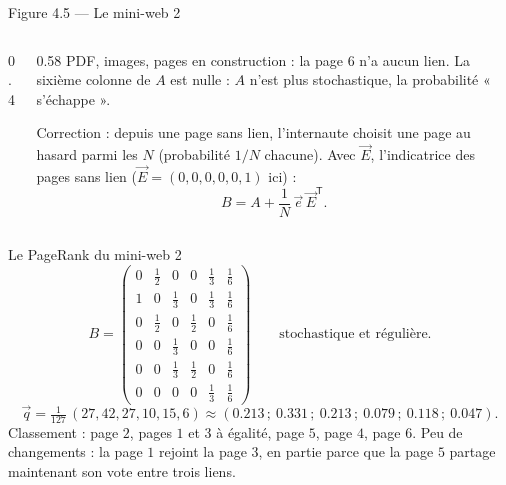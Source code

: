 \begin{frame}{Figure 4.5 --- Le mini-web 2}
  \begin{columns}[c]
    \begin{column}{0.4\textwidth}
    \end{column}
    \begin{column}{0.58\textwidth}
      \small PDF, images, pages en construction : la page $6$ n'a aucun
      lien. La sixième colonne de $A$ est nulle : $A$ n'est plus
      stochastique, la probabilité « s'échappe ».
      \vspace{4pt}

      Correction : depuis une page sans lien, l'internaute choisit une
      page au hasard parmi les $N$ (probabilité $1/N$ chacune). Avec
      $\vec E$, l'indicatrice des pages sans lien
      ($\vec E=(0,0,0,0,0,1)$ ici) :
      \[
        B = A+\frac1N\,\vec e\,\vec E^{\mathsf T}. \tag{4.2}
      \]
    \end{column}
  \end{columns}
\end{frame}

\begin{frame}{Le PageRank du mini-web 2}
  \small
  \[
    B = \begin{pmatrix}
      0 & \tfrac12 & 0 & 0 & \tfrac13 & \tfrac16\\[2pt]
      1 & 0 & \tfrac13 & 0 & \tfrac13 & \tfrac16\\[2pt]
      0 & \tfrac12 & 0 & \tfrac12 & 0 & \tfrac16\\[2pt]
      0 & 0 & \tfrac13 & 0 & 0 & \tfrac16\\[2pt]
      0 & 0 & \tfrac13 & \tfrac12 & 0 & \tfrac16\\[2pt]
      0 & 0 & 0 & 0 & \tfrac13 & \tfrac16
    \end{pmatrix}
    \qquad \text{stochastique et régulière.}
  \]
  \[
    \vec q = \tfrac1{127}\,(27, 42, 27, 10, 15, 6)
    \approx (\num{0.213}\,;\ \num{0.331}\,;\ \num{0.213}\,;\
    \num{0.079}\,;\ \num{0.118}\,;\ \num{0.047}).
  \]
  Classement : page $2$, pages $1$ et $3$ à égalité, page $5$, page $4$,
  page $6$. Peu de changements : la page $1$ rejoint la page $3$, en
  partie parce que la page $5$ partage maintenant son vote entre trois
  liens.
\end{frame}

